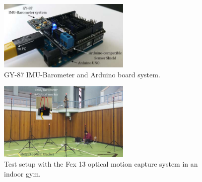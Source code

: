\documentclass[10pt,journal,compsoc]{IEEEtran}
\begin{document}
\begin{figure}[!t]
\centering
\includegraphics[width=2.5in]{fig2}
\caption{GY-87 IMU-Barometer and Arduino board system.}
\label{fig2}
\end{figure}

\begin{figure}[!t]
\centering
\includegraphics[width=2.5in]{fig3}
\caption{Test setup with the Fex 13 optical motion capture system in an indoor gym.}
\label{fig3}
\end{figure}
\end{document}
